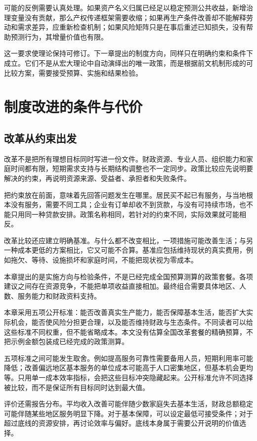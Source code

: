 \documentclass[UTF8,fontset=fandol,zihao=-4,oneside,openany]{ctexbook}
\begin{document}
可能的反例需要认真处理。如果资产名义归属已经足以稳定预测公共收益，新增治理变量没有贡献，那么产权传递框架需要收缩；如果再生产条件改善却不能解释劳动和需求差异，应重新检查机制；如果风险矩阵只是在事后重述已知损失，没有帮助预测行为，其增量价值也有限。

这一要求使理论保持可修订。下一章提出的制度方向，同样只在明确约束和条件下成立。它们不是从宏大理论中自动演绎出的唯一政策，而是根据前文机制形成的可比较方案，需要接受预算、实施和结果检验。


\chapter{制度改进的条件与代价}
\section{改革从约束出发}
改革不是把所有理想目标同时写进一份文件。财政资源、专业人员、组织能力和家庭时间都有限，短期需求支持与长期结构调整也不一定同步。政策比较应先说明要解决的约束，再说明资源来源、受益者、承担者和失败条件。

\label{arg:P247}
把约束放在前面，意味着先回答问题发生在哪里。居民买不起已有服务，与当地根本没有服务，需要不同工具；企业有订单却收不到货款，与没有可持续市场，也不能只用同一种贷款安排。政策名称相同，若针对的约束不同，实际效果就可能相反。

改革比较还应建立明确基准。与什么都不改变相比，一项措施可能改善生活；与另一种成本更低的方案相比，它又可能不合算。基准应包括维持现状的真实费用，例如拖欠、等待、设施损坏和家庭时间，不能把现状视为零成本。

本章提出的是实施方向与检验条件，不是已经完成全国预算测算的政策套餐。各项建议之间存在资源竞争，不能把单项收益直接相加。最终组合需要具体地区、人数、服务能力和财政资料支持。

本章采用五项公开标准：能否改善真实生产能力，能否保障基本生活，能否扩大实际机会，能否使风险分担更合理，以及能否维持财政与生态条件。不同读者可以给这些标准不同权重，但不能省略成本。本文没有估算全国改革套餐的精确预算，不把示例金额包装成已经完成的政策测算。

\label{arg:P248}
五项标准之间可能发生取舍。例如提高服务可靠性需要备用人员，短期利用率可能降低；改善偏远地区基本服务的单位成本可能高于人口密集地区，但基本机会更均等。只用单一成本效率指标，会把这些目标冲突隐藏起来。公开标准允许不同选择被比较，而不是保证所有目标同时达到最大值。

评价还需报告分布。平均收入改善可能伴随少数家庭失去基本生活，财政总额稳定可能伴随某些地区服务明显下降。对于基本保障，可以设定最低可接受条件；对于超过底线的资源安排，再讨论效率与偏好。底线本身属于需要公开说明的价值选择。
\end{document}
